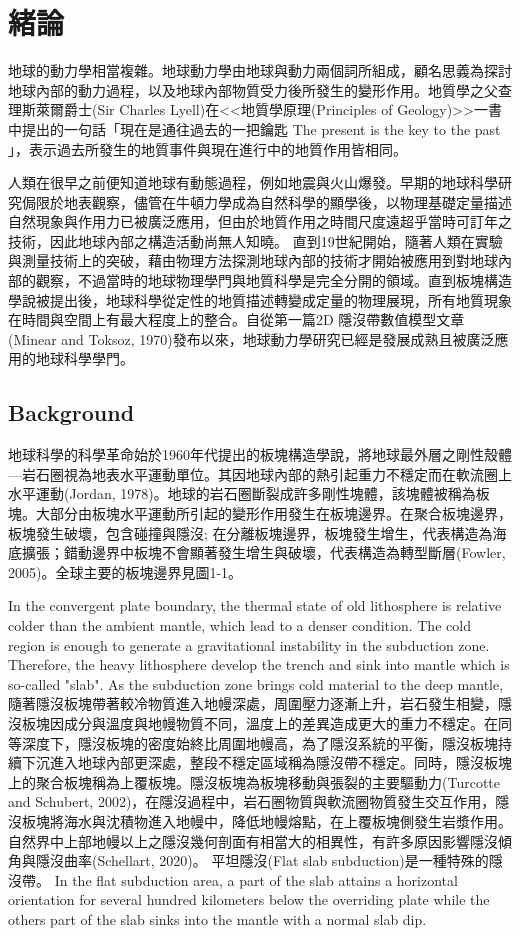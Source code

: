 
\chapter{緒論}

地球的動力學相當複雜。地球動力學由地球與動力兩個詞所組成，顧名思義為探討地球內部的動力過程，以及地球內部物質受力後所發生的變形作用。地質學之父查理斯萊爾爵士(Sir Charles Lyell)在<<地質學原理(Principles of Geology)>>一書中提出的一句話「現在是通往過去的一把鑰匙 The present is the key to the past 」，表示過去所發生的地質事件與現在進行中的地質作用皆相同。

人類在很早之前便知道地球有動態過程，例如地震與火山爆發。早期的地球科學研究侷限於地表觀察，儘管在牛頓力學成為自然科學的顯學後，以物理基礎定量描述自然現象與作用力已被廣泛應用，但由於地質作用之時間尺度遠超乎當時可訂年之技術，因此地球內部之構造活動尚無人知曉。 直到19世紀開始，隨著人類在實驗與測量技術上的突破，藉由物理方法探測地球內部的技術才開始被應用到對地球內部的觀察，不過當時的地球物理學門與地質科學是完全分開的領域。直到板塊構造學說被提出後，地球科學從定性的地質描述轉變成定量的物理展現，所有地質現象在時間與空間上有最大程度上的整合。自從第一篇2D 隱沒帶數值模型文章(Minear and Toksoz, 1970)發布以來，地球動力學研究已經是發展成熟且被廣泛應用的地球科學學門。
\section{Background}

地球科學的科學革命始於1960年代提出的板塊構造學說，將地球最外層之剛性殼體---岩石圈視為地表水平運動單位。其因地球內部的熱引起重力不穩定而在軟流圈上水平運動(Jordan, 1978)。地球的岩石圈斷裂成許多剛性塊體，該塊體被稱為板塊。大部分由板塊水平運動所引起的變形作用發生在板塊邊界。在聚合板塊邊界，板塊發生破壞，包含碰撞與隱沒; 在分離板塊邊界，板塊發生增生，代表構造為海底擴張；錯動邊界中板塊不會顯著發生增生與破壞，代表構造為轉型斷層(Fowler, 2005)。全球主要的板塊邊界見圖1-1。

In the convergent plate boundary, the thermal state of old lithosphere is relative colder than the ambient mantle, which lead to a denser condition. The cold region is enough to generate a gravitational instability in the subduction zone. Therefore, the heavy lithosphere develop the trench and sink into mantle which is so-called "slab". As the subduction zone brings cold material to the deep mantle, 隨著隱沒板塊帶著較冷物質進入地幔深處，周圍壓力逐漸上升，岩石發生相變，隱沒板塊因成分與溫度與地幔物質不同，溫度上的差異造成更大的重力不穩定。在同等深度下，隱沒板塊的密度始終比周圍地幔高，為了隱沒系統的平衡，隱沒板塊持續下沉進入地球內部更深處，整段不穩定區域稱為隱沒帶不穩定。同時，隱沒板塊上的聚合板塊稱為上覆板塊。隱沒板塊為板塊移動與張裂的主要驅動力(Turcotte and Schubert, 2002)，在隱沒過程中，岩石圈物質與軟流圈物質發生交互作用，隱沒板塊將海水與沈積物進入地幔中，降低地幔熔點，在上覆板塊側發生岩漿作用。自然界中上部地幔以上之隱沒幾何剖面有相當大的相異性，有許多原因影響隱沒傾角與隱沒曲率(Schellart, 2020)。
平坦隱沒(Flat slab subduction)是一種特殊的隱沒帶。
 In the flat subduction area, a part of the slab attains a horizontal orientation for several hundred kilometers below the overriding plate while the others part of the slab sinks into the mantle with a normal slab dip.

